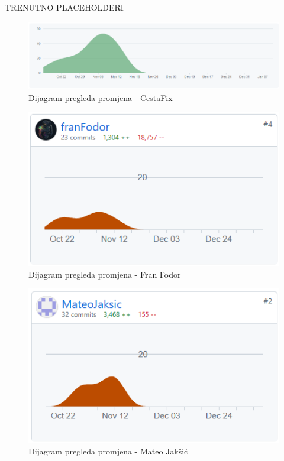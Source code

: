 		TRENUTNO PLACEHOLDERI
	
		\begin{figure}[H]
			\includegraphics[scale=0.70]{slike/DPP.png} %
			\centering
			\caption{Dijagram pregleda promjena - CestaFix}
			\label{fig:DijagramPregledaPromjena}
		\end{figure}

		\begin{figure}[H]
			\includegraphics[scale=0.80]{slike/fran.png} %
			\centering
			\caption{Dijagram pregleda promjena - Fran Fodor}
			\label{fig:DijagramPregledaPromjena}
		\end{figure}

		\begin{figure}[H]
			\includegraphics[scale=0.80]{slike/mateo.png} %
			\centering
			\caption{Dijagram pregleda promjena - Mateo Jakšić}
			\label{fig:DijagramPregledaPromjena}
		\end{figure}

